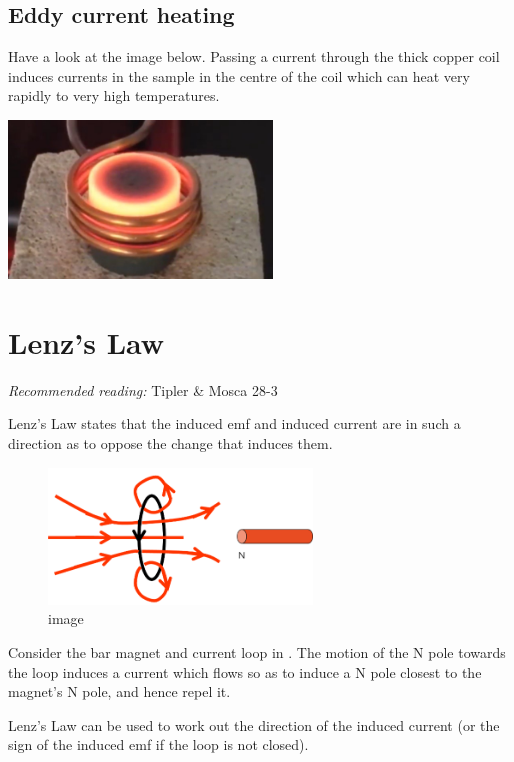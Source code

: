 \documentclass[
]{book}
\begin{document}
\hypertarget{sec:eddy}{%
\subsection{Eddy current heating}\label{sec:eddy}}

Have a look at the image below. Passing a current through the thick
copper coil induces currents in the sample in the centre of the coil
which can heat very rapidly to very high temperatures.

\includegraphics[width=70mm,height=\textheight]{Figures/eddyCurHeat.jpg} \protect\hypertarget{fig:eddyHeat}{}{}

\hypertarget{lenzs-law}{%
\section{Lenz's Law}\label{lenzs-law}}

\emph{Recommended reading:} Tipler \& Mosca 28-3

Lenz's Law states that the induced emf and induced current are in such a
direction as to oppose the change that induces them.

\begin{figure}
\centering
\includegraphics[width=70mm,height=\textheight]{Figures/movingMag.png}
\caption{image}
\end{figure}

Consider the bar magnet and current loop in . The motion of the N pole
towards the loop induces a current which flows so as to induce a N pole
closest to the magnet's N pole, and hence repel it.

Lenz's Law can be used to work out the direction of the induced current
(or the sign of the induced emf if the loop is not closed).
\end{document}
